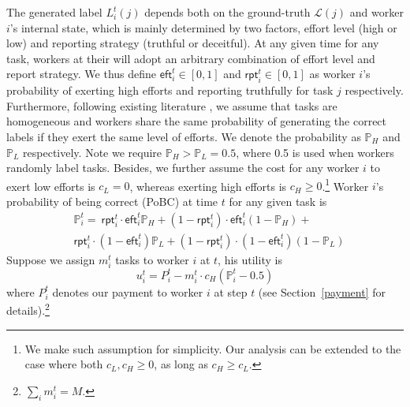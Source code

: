 The generated label $L^{t}_{i}(j)$ depends both on the ground-truth $\mathcal{L}(j)$ and worker $i$'s internal state, which is mainly determined by two factors, effort level (high or low) and reporting strategy (truthful or deceitful).
At any given time for any task, workers at their will adopt an arbitrary combination of effort level and report strategy. We thus define $\textsf{eft}^{t}_i\in[0,1]$ and $\textsf{rpt}^{t}_i\in[0,1]$ as worker $i$'s probability of exerting high efforts and reporting truthfully for task $j$ %
respectively. Furthermore, following existing literature \citet{dasgupta2013crowdsourced,liu2017sequential}, we assume that tasks are homogeneous and workers share the same probability of generating the correct labels if they exert the same level of efforts. We denote the probability as $\mathbb{P}_{H}$ and $\mathbb{P}_{L}$ respectively. Note we require $\mathbb{P}_{H} > \mathbb{P}_{L} = 0.5$, where 0.5 is used when workers randomly label tasks.
Besides, we further assume the cost for any worker $i$ to exert low efforts is $c_{L} = 0$, whereas exerting high efforts is $c_{H} \geq 0$.\footnote{We make such assumption for simplicity. Our analysis can be extended to the case where both $c_{L},  c_{H} \geq 0$, as long as $c_{H} \geq c_{L}$.}
Worker $i$'s probability of being correct (PoBC) at time $t$ for any given task is 
\begin{equation}
\begin{split}
&\mathbb{P}^{t}_i  = ~\textsf{rpt}^{t}_i \cdot\textsf{eft}^{t}_i \mathbb{P}_{H}+ (1-\textsf{rpt}^{t}_i)\cdot \textsf{eft}^{t}_i (1-\mathbb{P}_{ H})+\\
&\textsf{rpt}^{t}_i \cdot(1-\textsf{eft}^{t}_i) \mathbb{P}_{L}+(1-\textsf{rpt}^{t}_i) \cdot(1-\textsf{eft}^{t}_i) (1-\mathbb{P}_{L})
\end{split}
\end{equation}
Suppose we assign $m^{t}_i$ tasks to worker $i$ at $t$, his utility is 
\begin{equation}
u_i^t=P_i^t - m^{t}_i \cdot c_H (\mathbb{P}_i^t-0.5)
\end{equation}
where $P^{t}_{i}$ denotes our payment to worker $i$ at step $t$ (see Section~\ref{payment} for details).\footnote{$\sum_i m^t_i = M$.}
 
